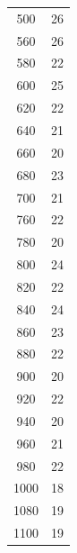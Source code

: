 \begin{table}
\begin{tabular}{c|c}
500	&26\\ 

560	&26\\ 

580	&22\\ 
	
600	&25\\ 

620	&22\\ 

640	&21\\ 

660	&20\\ 

680	&23\\ 

700	&21\\ 

760	&22\\ 

780	&20\\ 

800	&24\\ 

820	&22\\ 

840	&24\\ 

860	&23\\ 

880	&22\\ 

900	&20\\ 

920	&22\\ 

940	&20\\ 

960	&21\\ 

980	&22\\ 

1000&	18\\ 

1080&	19\\ 
	
1100&	19\\ 


\end{tabular}
\end{table}

